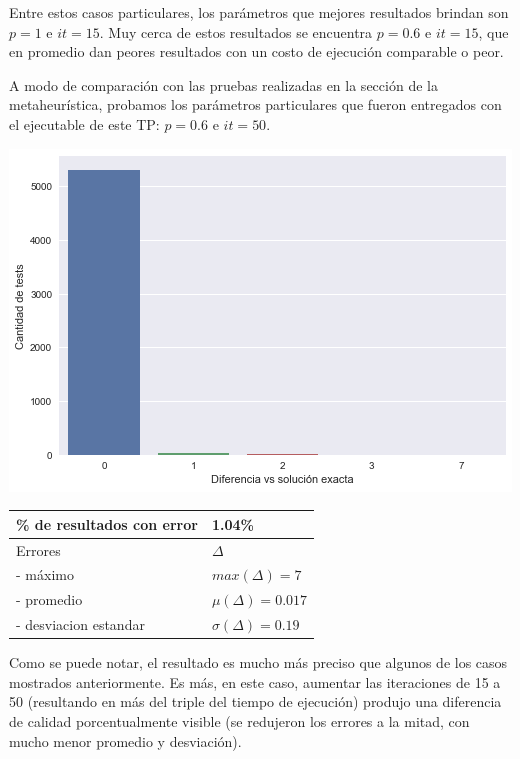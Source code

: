Entre estos casos particulares, los parámetros que mejores resultados brindan son $p = 1$ e $it = 15$. Muy cerca de estos resultados se encuentra $p = 0.6$ e $it = 15$, que en promedio dan peores resultados con un costo de ejecución comparable o peor.

A modo de comparación con las pruebas realizadas en la sección de la metaheurística, probamos los parámetros particulares que fueron entregados con el ejecutable de este TP: $p = 0.6$ e $it = 50$.

\noindent
\begin{minipage}{0.55\textwidth}
    \hfill
    \includegraphics[scale=0.55]{img/accuracy-grasp50.png}
\end{minipage}
\hfill
\begin{minipage}{0.44\textwidth}
    \begin{center}

        \begin{tabular}{ | l l |}
            \hline
            \% de resultados con error & 1.04\% \\ \hline
            Errores & $\Delta$ \\
            - máximo & $max(\Delta) = 7$ \\
            - promedio & $\mu(\Delta) = 0.017$ \\
            - desviacion estandar & $\sigma(\Delta) = 0.19$ \\
            \hline
        \end{tabular}
    \end{center}
\end{minipage}

Como se puede notar, el resultado es mucho más preciso que algunos de los casos mostrados anteriormente. Es más, en este caso, aumentar las iteraciones de 15 a 50 (resultando en más del triple del tiempo de ejecución) produjo una diferencia de calidad porcentualmente visible (se redujeron los errores a la mitad, con mucho menor promedio y desviación).

